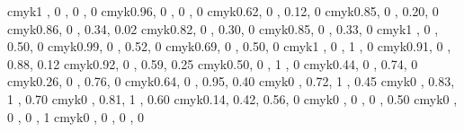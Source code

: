 \definecolor{cyan}          {cmyk}{1   , 0   , 0   , 0   }
\definecolor{processblue}    {cmyk}{0.96, 0   , 0   , 0   }
\definecolor{skyblue}        {cmyk}{0.62, 0   , 0.12, 0   }
\definecolor{turquoise}      {cmyk}{0.85, 0   , 0.20, 0   }
\definecolor{tealblue}      {cmyk}{0.86, 0   , 0.34, 0.02}
\definecolor{aquamarine}    {cmyk}{0.82, 0   , 0.30, 0   }
\definecolor{bluegreen}      {cmyk}{0.85, 0   , 0.33, 0   }
\definecolor{emerald}        {cmyk}{1   , 0   , 0.50, 0   }
\definecolor{junglegreen}    {cmyk}{0.99, 0   , 0.52, 0   }
\definecolor{seagreen}      {cmyk}{0.69, 0   , 0.50, 0   }
\definecolor{green}          {cmyk}{1   , 0   , 1   , 0   }
\definecolor{forestgreen}    {cmyk}{0.91, 0   , 0.88, 0.12}
\definecolor{pinegreen}      {cmyk}{0.92, 0   , 0.59, 0.25}
\definecolor{limegreen}      {cmyk}{0.50, 0   , 1   , 0   }
\definecolor{yellowgreen}    {cmyk}{0.44, 0   , 0.74, 0   }
\definecolor{springgreen}    {cmyk}{0.26, 0   , 0.76, 0   }
\definecolor{olivegreen}    {cmyk}{0.64, 0   , 0.95, 0.40}
\definecolor{rawsienna}      {cmyk}{0   , 0.72, 1   , 0.45}
\definecolor{sepia}          {cmyk}{0   , 0.83, 1   , 0.70}
\definecolor{brown}          {cmyk}{0   , 0.81, 1   , 0.60}
\definecolor{tan}            {cmyk}{0.14, 0.42, 0.56, 0   }
\definecolor{gray}          {cmyk}{0   , 0   , 0   , 0.50}
\definecolor{black}          {cmyk}{0   , 0   , 0   , 1   }
\definecolor{white}          {cmyk}{0   , 0   , 0   , 0   } 

